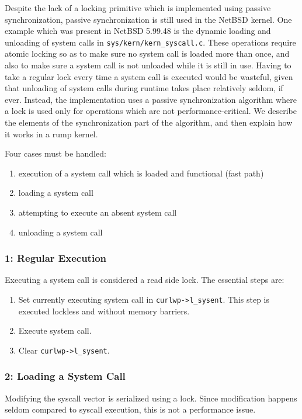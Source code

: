 Despite the lack of a locking primitive which is implemented using
passive synchronization, passive synchronization is still used in
the NetBSD kernel.  One example which was present in NetBSD 5.99.48 is the
dynamic loading and unloading of system calls in
\verb+sys/kern/kern_syscall.c+.  These operations require atomic
locking so as to make sure no system call is loaded more than once,
and also to make sure a system call is not unloaded while
it is still in use.  Having to take a regular lock every time a
system call is executed would be wasteful, given that unloading of
system calls during runtime takes place relatively seldom, if ever.
Instead, the implementation uses a passive synchronization algorithm
where a lock is used only for operations which are not performance-critical.
We describe the elements of the synchronization part
of the algorithm, and then explain how it works in a rump kernel.

Four cases must be handled:

\begin{enumerate}
\item	execution of a system call which is loaded and functional
	(fast path)
\item	loading a system call
\item	attempting to execute an absent system call
\item	unloading a system call
\end{enumerate}

\subsubsection*{1: Regular Execution}

Executing a system call is considered a read side lock.  The essential
steps are:

\begin{enumerate}
\item	Set currently executing system call in \verb+curlwp->l_sysent+.
	This step is executed lockless and without memory barriers.
\item	Execute system call.
\item	Clear \verb+curlwp->l_sysent+.
\end{enumerate}

\subsubsection*{2: Loading a System Call}

Modifying the syscall vector is serialized using a lock.
Since modification happens seldom compared to syscall execution,
this is not a performance issue.

